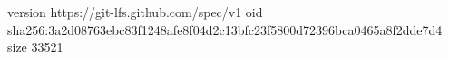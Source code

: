 version https://git-lfs.github.com/spec/v1
oid sha256:3a2d08763ebc83f1248afe8f04d2c13bfc23f5800d72396bca0465a8f2dde7d4
size 33521
